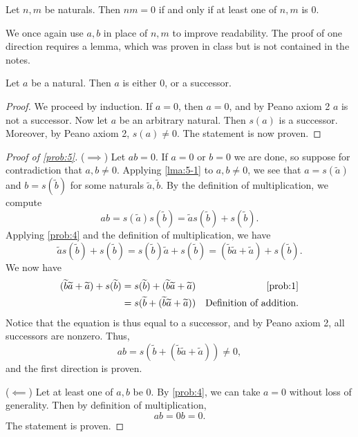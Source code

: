 \documentclass[11pt, letterpaper]{article}
\begin{document}
\begin{problem}\label{prob:5}
	Let $n,m$ be naturals. Then $nm=0$ if and only if at least one of $n,m$ is $0$.
\end{problem}
We once again use $a,b$ in place of $n,m$ to improve readability. The proof of one direction requires a lemma, which was proven in class but is not contained in the notes.
\begin{lemma}\label{lma:5-1}
	Let $a$ be a natural. Then $a$ is either 0, or a successor.
\end{lemma}
\begin{proof}
	We proceed by induction. If $a=0$, then $a=0$, and by Peano axiom 2 $a$ is not a successor.
		Now let $a$ be an arbitrary natural. Then $s(a)$ is a successor. Moreover, by Peano axiom 2, $s(a)\neq 0$. The statement is now proven.
\end{proof}
\begin{proof}[Proof of \cref{prob:5}]
	($\implies $) Let $ab=0$. If $a=0$ or $b=0$ we are done, so suppose for contradiction that $a,b\neq 0$. Applying \cref{lma:5-1} to $a,b\neq 0$, we see that $a=s(\widetilde{a} )$ and $b=s(\widetilde{b} )$ for some naturals $\widetilde{a} ,\widetilde{b}$. By the definition of multiplication, we compute
	\[
		ab = s(\widetilde{a} )s(\widetilde{b} ) = \widetilde{a} s(\widetilde{b} )+s(\widetilde{b})
	.\]
	Applying \cref{prob:4} and the definition of multiplication, we have
	\[
		\widetilde{a} s(\widetilde{b} )+s(\widetilde{b})  = s(\widetilde{b}) \widetilde{a} +s(\widetilde{b}) =(\widetilde{b} \widetilde{a} +\widetilde{a} )+s(\widetilde{b} )
	.\]
	We now have
	\begin{align*}
		(\widetilde{b} \widetilde{a} +\widetilde{a} )+s(\widetilde{b} )&=s(\widetilde{b} )+( \widetilde{b} \widetilde{a} +\widetilde{a} ) &\text{\Cref{prob:1}} \\
											     &=s( \widetilde{b} +(\widetilde{b} \widetilde{a} +\widetilde{a} ))  &\text{Definition of addition}
	.\end{align*}
	Notice that the equation is thus equal to a successor, and by Peano axiom 2, all successors are nonzero. Thus,
	\[
		ab=s( \widetilde{b} +(\widetilde{b} \widetilde{a} +\widetilde{a} )) \neq 0
	,\]
	and the first direction is proven.
	

	($\impliedby $) Let at least one of $a,b$ be $0$. By \cref{prob:4}, we can take $a=0$ without loss of generality. Then by definition of multiplication,
	\[
		ab=0b=0
	.\]
	The statement is proven.
\end{proof}
\end{document}
